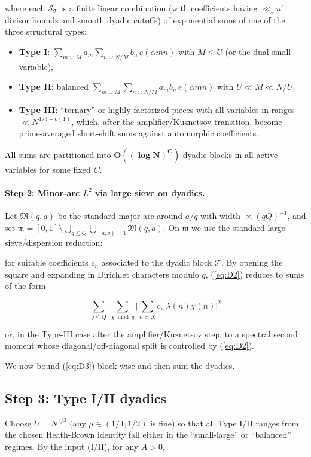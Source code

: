 \documentclass[11pt]{article}
\def\eqref#1{(\ref{#1})}%
\theoremstyle{definition}
\theoremstyle{remark}
\numberwithin{equation}{part}
\begin{document}
where each $\mathcal S_{\mathcal T}$ is a finite linear combination (with coefficients having $\ll_\epsilon n^\epsilon$ divisor bounds and smooth dyadic cutoffs) of exponential sums of one of the three structural types:

\begin{itemize}
	\item \textbf{Type I}: $\displaystyle \sum_{m\asymp M} a_m \sum_{n\asymp N/M} b_n\,e(\alpha mn)$ with $M\le U$ (or the dual small variable),
	\item \textbf{Type II}: balanced $\displaystyle \sum_{m\asymp M}\sum_{n\asymp N/M} a_m b_n\,e(\alpha mn)$ with $U\ll M\ll N/U$,
	\item \textbf{Type III}: ``ternary'' or highly factorized pieces with all variables in ranges $ \ll N^{1/3+o(1)}$, which, after the amplifier/Kuznetsov transition, become prime-averaged short-shift sums against automorphic coefficients.
\end{itemize}

All sums are partitioned into $\mathbf{O((\log N)^C)}$ dyadic blocks in all active variables for some fixed $C$.

\paragraph{Step 2: Minor-arc $L^2$ via large sieve on dyadics.}
Let $\mathfrak M(q,a)$ be the standard major arc around $a/q$ with width $\asymp (qQ)^{-1}$, and set $\mathfrak m=[0,1]\setminus \bigcup_{q\le Q}\bigcup_{(a,q)=1}\mathfrak M(q,a)$. On $\mathfrak m$ we use the standard large-sieve/dispersion reduction:

for suitable coefficients $c_n$ associated to the dyadic block $\mathcal T$. By opening the square and expanding in Dirichlet characters modulo $q$, \eqref{eq:D2} reduces to sums of the form

\begin{equation}\label{eq:D3}
	\sum_{q\le Q}\ \sum_{\chi\bmod q}
	\Big|\sum_{n\asymp X} c_n\,\lambda(n)\chi(n)\Big|^2
\end{equation}

or, in the Type-III case after the amplifier/Kuznetsov step, to a spectral second moment whose diagonal/off-diagonal split is controlled by \eqref{eq:D2}.

We now bound \eqref{eq:D3} block-wise and then sum the dyadics.


\subsection{Step 3: Type I/II dyadics}
Choose $U=N^{1/3}$ (any $\mu\in(1/4,1/2)$ is fine) so that all Type I/II ranges from the chosen Heath-Brown identity fall either in the “small-large” or “balanced” regimes. By the input (I/II), for any $A>0$,
\end{document}
